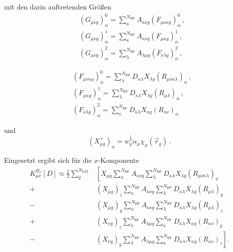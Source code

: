 	mit den darin auftretenden Größen
	\begin{equation}
	\begin{aligned}
	&(G_{\mu\nu g})_\alpha^0=\sum_\kappa^{N_{\textrm{BF}}}A_{\kappa\nu g}(F_{\mu\nu\kappa g})_\alpha^0\, ,\\
	&(G_{\mu\nu g})_\alpha^1=\sum_\kappa^{N_{\textrm{BF}}}A_{\kappa\nu g}(F_{\mu\kappa g})_\alpha^1\, ,\\
	&(G_{\mu\nu g})_\alpha^2=\sum_\lambda^{N_{\textrm{BF}}}A_{\lambda\mu g}(F_{\nu\lambda g})_\alpha^2\, ,
	\end{aligned}
	\end{equation}	
	
	\begin{equation}
	\begin{aligned}
	&(F_{\mu\nu\kappa g})_\alpha^0=\sum_\lambda^{N_{\textrm{BF}}}D_{\kappa\lambda}X_{\lambda g}(R_{\mu\nu\kappa\lambda})_\alpha\, ,\\
	&(F_{\mu\kappa g})_\alpha^1=\sum_\lambda^{N_{\textrm{BF}}}D_{\kappa\lambda}X_{\lambda g}(R_{\mu\lambda})_\alpha\, ,\\
	&(F_{\nu\lambda g})_\alpha^2=\sum_\kappa^{N_{\textrm{BF}}}D_{\kappa\lambda}X_{\kappa g}(R_{\kappa\nu})_\alpha
	\end{aligned}
	\end{equation}
	
	und
	\begin{equation}
	\left(X_{\mu g}^+\right)_\alpha=w_g^{\frac{1}{2}}\alpha_\mu\chi_\mu(\vec{r}_g)\, .
	\end{equation}
	
	Eingesetzt ergibt sich für die $x$-Komponente
	\begin{equation}
	\begin{aligned}
	K_{\mu\nu}^{B_x}[D]\approx\frac{1}{2}\sum_{g}^{N_{\textrm{GIT}}}&\left[X_{\mu g}\sum_\kappa^{N_{\textrm{BF}}}A_{\kappa\nu g}\sum_\lambda^{N_{\textrm{BF}}}D_{\kappa\lambda}X_{\lambda g}(R_{\mu\nu\kappa\lambda})_x\right.\\
	+&\left(X_{\mu g}\right)_z\sum_\kappa^{N_{\textrm{BF}}}A_{\kappa\nu g}\sum_\lambda^{N_{\textrm{BF}}}D_{\kappa\lambda}X_{\lambda g}(R_{\mu\lambda})_y\\
	-&\left(X_{\mu g}\right)_y\sum_\kappa^{N_{\textrm{BF}}}A_{\kappa\nu g}\sum_\lambda^{N_{\textrm{BF}}}D_{\kappa\lambda}X_{\lambda g}(R_{\mu\lambda})_z\\
	+&\left(X_{\nu g}\right)_z\sum_\lambda^{N_{\textrm{BF}}}A_{\lambda\mu g}\sum_\kappa^{N_{\textrm{BF}}}D_{\kappa\lambda}X_{\kappa g}(R_{\kappa\nu})_y\\
	-&\left.\left(X_{\nu g}\right)_y\sum_\lambda^{N_{\textrm{BF}}}A_{\lambda\mu g}\sum_\kappa^{N_{\textrm{BF}}}D_{\kappa\lambda}X_{\kappa g}(R_{\kappa\nu})_z\right].
	\end{aligned}
	\end{equation}
	
